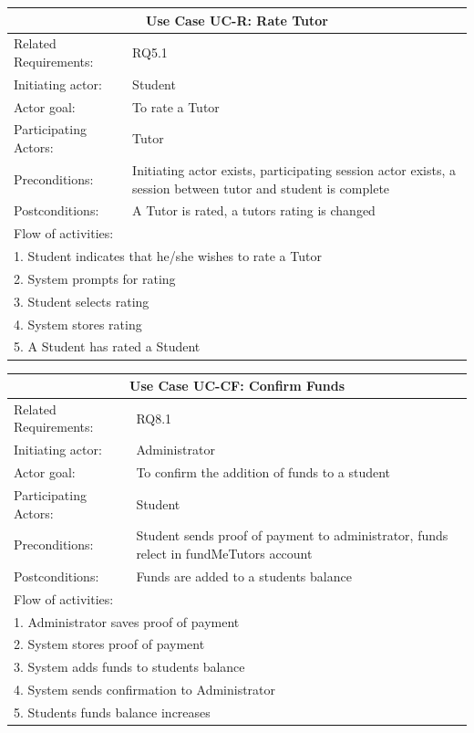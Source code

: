 \documentclass[12pt]{article}
\begin{document}
    \begin{tabular}{| l | p{10cm}| }
      \hline\multicolumn{2}{|c|}{ \textbf{Use Case UC-R: Rate Tutor} }\\ \hline
      Related Requirements: &  RQ5.1\\ \hline
      Initiating actor: & Student \\ \hline
      Actor goal: & To rate a Tutor\\ \hline
      Participating Actors: &Tutor\\ \hline
      Preconditions: &Initiating actor exists, participating session actor exists, a session between  tutor and student is complete\\ \hline
      Postconditions: & A Tutor is rated, a tutors rating is changed\\ \hline
      \multicolumn{2}{|l|}{Flow of activities:}\\ \hline
      \multicolumn{2}{|p{15cm}|}{1. Student indicates that he/she wishes to rate a Tutor}\\
      \multicolumn{2}{|p{15cm}|}{2. System prompts for rating}\\
      \multicolumn{2}{|l|}{3. Student selects rating}\\
      \multicolumn{2}{|l|}{4. System stores rating}\\
      \multicolumn{2}{|l|}{5. A Student has rated a Student}\\
       \hline
    \end{tabular}

		\begin{tabular}{| l | p{10cm}| }
      \hline\multicolumn{2}{|c|}{ \textbf{Use Case UC-CF: Confirm Funds} }\\ \hline
      Related Requirements: &RQ8.1\\ \hline
      Initiating actor: & Administrator\\ \hline
      Actor goal: &To confirm the addition of funds to a student\\ \hline
      Participating Actors: &Student\\ \hline
      Preconditions: &Student sends proof of payment to administrator, funds relect in fundMeTutors account\\ \hline
      Postconditions: &Funds are added to a students balance\\ \hline
      \multicolumn{2}{|l|}{Flow of activities:}\\ \hline
      \multicolumn{2}{|p{15cm}|}{1. Administrator saves proof of payment}\\
      \multicolumn{2}{|p{15cm}|}{2. System stores proof of payment}\\
      \multicolumn{2}{|l|}{3. System adds funds to students balance}\\
      \multicolumn{2}{|l|}{4. System sends confirmation to Administrator}\\
      \multicolumn{2}{|l|}{5. Students funds balance increases}\\
       \hline
    \end{tabular}
\end{document}

